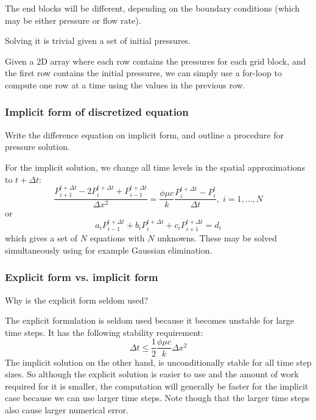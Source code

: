 The end blocks will be different, depending on the boundary conditions (which may be either pressure or flow rate).

Solving it is trivial given a set of initial pressures.

Given a 2D array where each row contains the pressures for each grid block, and the first row contains the initial pressures, we can simply use a for-loop to compute one row at a time using the values in the previous row.


\subsubsection{Implicit form of discretized equation} %
\label{ssub:implicit_form_of_discretized_equation}

\begin{question}
  Write the difference equation on implicit form, and outline a procedure for pressure solution.
\end{question}

For the implicit solution, we change all time levels in the spatial approximations to $t+\Delta t$:
\begin{equation}
  \frac{P_{i+1}^{t+\Delta t}-2P_{i}^{t+\Delta t}+P_{i-1}^{t+\Delta t}}{\Delta x^{2}}=\frac{\phi\mu c}{k}\frac{P_{i}^{t+\Delta t}-P_{i}^{t}}{\Delta t}, \; i=1,\dots, N
\end{equation}
or
\begin{equation}
  a_{i}P_{i-1}^{t+\Delta t}+b_{i}P_{i}^{t+\Delta t}+c_{i}P_{i+1}^{t+\Delta t}=d_{i}
\end{equation}
which gives a set of $N$ equations with $N$ unknowns. These may be solved simultaneously using for example Gaussian elimination.

\subsubsection{Explicit form vs. implicit form} %
\label{ssub:explicit_form_vs_implicit_form}

\begin{question}
  Why is the explicit form seldom used?
\end{question}

The explicit formulation is seldom used because it becomes unstable for large time steps. It has the following stability requirement:
\begin{equation}
  \Delta t \leq \frac{1}{2} \frac{\phi \mu c}{k} \Delta x^2
\end{equation}
The implicit solution on the other hand, is unconditionally stable for all time step sizes. So although the explicit solution is easier to use and the amount of work required for it is smaller, the computation will generally be faster for the implicit case because we can use larger time steps. Note though that the larger time steps also cause larger numerical error.

